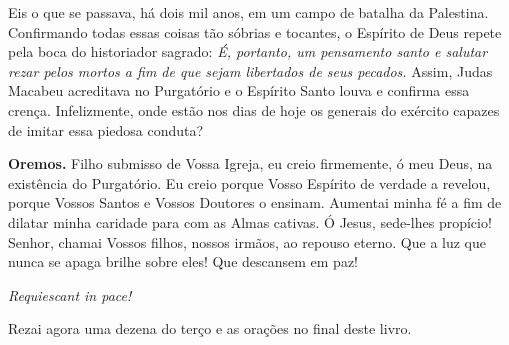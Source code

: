 Eis o que se passava, há dois mil anos, em um campo de batalha da Palestina. Confirmando todas essas coisas tão sóbrias e tocantes, o Espírito de Deus repete pela boca do historiador sagrado: \textit{É, portanto, um pensamento santo e salutar rezar pelos mortos a fim de que sejam libertados de seus pecados.} Assim, Judas Macabeu acreditava no Purgatório e o Espírito Santo louva e confirma essa crença. Infelizmente, onde estão nos dias de hoje os generais do exército capazes de imitar essa piedosa conduta?

\vspace{\baselineskip}\noindent \textbf{Oremos.} Filho submisso de Vossa Igreja, eu creio firmemente, ó meu Deus, na existência do Purgatório. Eu creio porque Vosso Espírito de verdade a revelou, porque Vossos Santos e Vossos Doutores o ensinam. Aumentai minha fé a fim de dilatar minha caridade para com as Almas cativas. Ó Jesus, sede-lhes propício! Senhor, chamai Vossos filhos, nossos irmãos, ao repouso eterno. Que a luz que nunca se apaga brilhe sobre eles! Que descansem em paz!



\begin{center}
\textit{Requiescant in pace!}
\end{center}

Rezai agora uma dezena do terço e as orações no final deste livro.
